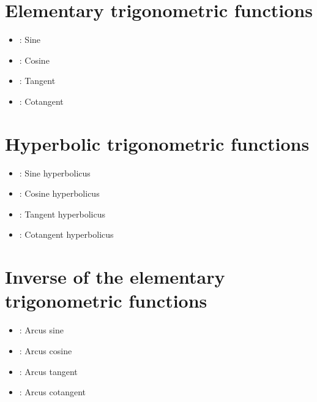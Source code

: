 \section{Elementary trigonometric functions}

\begin{itemize}

\item
{}:
Sine

\item
{}:
Cosine

\item
{}:
Tangent

\item
{}:
Cotangent

\end{itemize}



\section{Hyperbolic trigonometric functions}

\begin{itemize}

\item
{}:
Sine hyperbolicus

\item
{}:
Cosine hyperbolicus

\item
{}:
Tangent hyperbolicus

\item
{}:
Cotangent hyperbolicus

\end{itemize}



\section{Inverse of the elementary trigonometric functions}

\begin{itemize}

\item
{}:
Arcus sine

\item
{}:
Arcus cosine

\item
{}:
Arcus tangent

\item
{}:
Arcus cotangent

\end{itemize}



